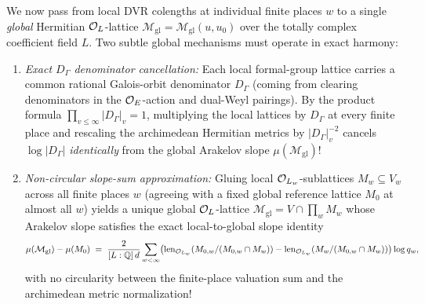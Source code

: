 We now pass from local DVR colengths at individual finite places $w$ to a single \emph{global} Hermitian $\mathcal{O}_L$-lattice $\mathcal{M}_{\mathrm{gl}} = \mathcal{M}_{\mathrm{gl}}(u, u_0)$ over the totally complex coefficient field $L$. Two subtle global mechanisms must operate in exact harmony:
\begin{enumerate}[label=(\arabic*)]
\item \emph{Exact $D_\Gamma$ denominator cancellation:} Each local formal-group lattice carries a common rational Galois-orbit denominator $D_\Gamma$ (coming from clearing denominators in the $\mathcal{O}_E$-action and dual-Weyl pairings). By the product formula $\prod_{v \le \infty} |D_\Gamma|_v = 1$, multiplying the local lattices by $D_\Gamma$ at every finite place and rescaling the archimedean Hermitian metrics by $|D_\Gamma|_v^{-2}$ cancels $\log|D_\Gamma|$ \emph{identically} from the global Arakelov slope $\mu(\mathcal{M}_{\mathrm{gl}})$!
\item \emph{Non-circular slope-sum approximation:} Gluing local $\mathcal{O}_{L_w}$-sublattices $M_w \subseteq V_w$ across all finite places $w$ (agreeing with a fixed global reference lattice $M_0$ at almost all $w$) yields a unique global $\mathcal{O}_L$-lattice $\mathcal{M}_{\mathrm{gl}} = V \cap \prod_w M_w$ whose Arakelov slope satisfies the exact local-to-global slope identity
  \begin{equation}
  \label{eq:09:local-global-slope}
    \mu(\mathcal{M}_{\mathrm{gl}}) - \mu(M_0)
    \;=\; \frac{2}{[L:\mathbb{Q}]\, d} \sum_{w < \infty} \bigl(\operatorname{len}_{\mathcal{O}_{L_w}}(M_{0,w} / (M_{0,w} \cap M_w)) - \operatorname{len}_{\mathcal{O}_{L_w}}(M_w / (M_{0,w} \cap M_w))\bigr) \log q_w,
  \end{equation}
  with no circularity between the finite-place valuation sum and the archimedean metric normalization!
\end{enumerate}

